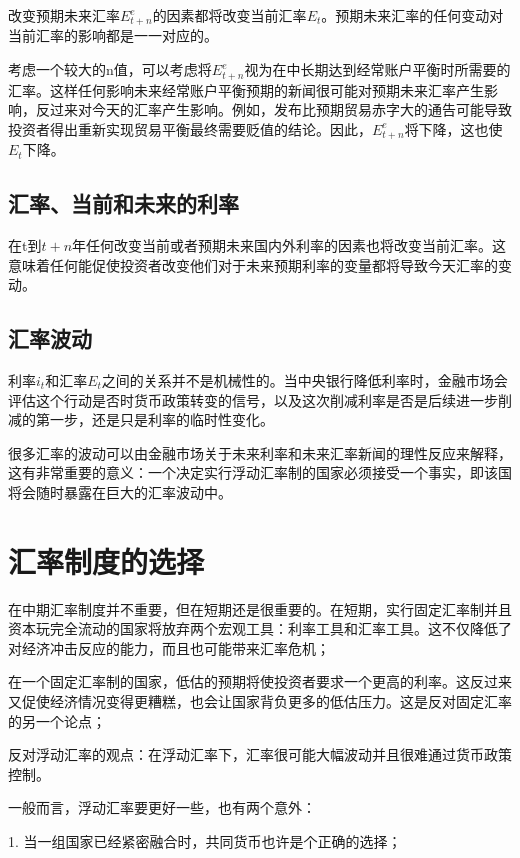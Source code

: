 \documentclass{article}
\begin{document}
改变预期未来汇率$ E^e_{t+n} $的因素都将改变当前汇率$ E_t $。预期未来汇率的任何变动对当前汇率的影响都是一一对应的。

考虑一个较大的n值，可以考虑将$ E_{t+n}^e $视为在中长期达到经常账户平衡时所需要的汇率。这样任何影响未来经常账户平衡预期的新闻很可能对预期未来汇率产生影响，反过来对今天的汇率产生影响。例如，发布比预期贸易赤字大的通告可能导致投资者得出重新实现贸易平衡最终需要贬值的结论。因此，$ E^e_{t+n} $将下降，这也使$ E_t $下降。

\subsection{汇率、当前和未来的利率}

在t到$ t+n $年任何改变当前或者预期未来国内外利率的因素也将改变当前汇率。这意味着任何能促使投资者改变他们对于未来预期利率的变量都将导致今天汇率的变动。

\subsection{汇率波动}

利率$ i_t $和汇率$ E_t $之间的关系并不是机械性的。当中央银行降低利率时，金融市场会评估这个行动是否时货币政策转变的信号，以及这次削减利率是否是后续进一步削减的第一步，还是只是利率的临时性变化。

很多汇率的波动可以由金融市场关于未来利率和未来汇率新闻的理性反应来解释，这有非常重要的意义：一个决定实行浮动汇率制的国家必须接受一个事实，即该国将会随时暴露在巨大的汇率波动中。

\section{汇率制度的选择}

在中期汇率制度并不重要，但在短期还是很重要的。在短期，实行固定汇率制并且资本玩完全流动的国家将放弃两个宏观工具：利率工具和汇率工具。这不仅降低了对经济冲击反应的能力，而且也可能带来汇率危机；

在一个固定汇率制的国家，低估的预期将使投资者要求一个更高的利率。这反过来又促使经济情况变得更糟糕，也会让国家背负更多的低估压力。这是反对固定汇率的另一个论点；

反对浮动汇率的观点：在浮动汇率下，汇率很可能大幅波动并且很难通过货币政策控制。

\hspace*{\fill}

一般而言，浮动汇率要更好一些，也有两个意外：

1. 当一组国家已经紧密融合时，共同货币也许是个正确的选择；
\end{document}
